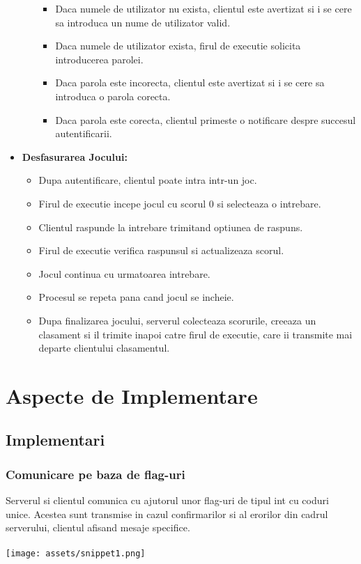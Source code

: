 \documentclass[runningheads]{llncs}
\begin{document}
\begin{itemize}[label=$\bullet$]
\begin{itemize}[label=$\bullet$]
                \begin{itemize}[label=$\bullet$]
                    \item Daca numele de utilizator nu exista, clientul este avertizat si i se cere sa introduca un nume de utilizator valid.
                    \item Daca numele de utilizator exista, firul de executie solicita introducerea parolei.
                    \item Daca parola este incorecta, clientul este avertizat si i se cere sa introduca o parola corecta.
                    \item Daca parola este corecta, clientul primeste o notificare despre succesul autentificarii.
                \end{itemize}
        \end{itemize}
    \item \textbf{Desfasurarea Jocului:}
        \begin{itemize}[label=$\bullet$]
            \item Dupa autentificare, clientul poate intra intr-un joc.
            \item Firul de executie incepe jocul cu scorul 0 si selecteaza o intrebare.
            \item Clientul raspunde la intrebare trimitand optiunea de raspuns.
            \item Firul de executie verifica raspunsul si actualizeaza scorul.
            \item Jocul continua cu urmatoarea intrebare.
            \item Procesul se repeta pana cand jocul se incheie.
            \item Dupa finalizarea jocului, serverul colecteaza scorurile, creeaza un clasament si il trimite inapoi catre firul de executie, care ii transmite mai departe clientului clasamentul.
        \end{itemize}
\end{itemize}

\section{Aspecte de Implementare}

\subsection{Implementari}

\subsubsection{Comunicare pe baza de flag-uri}
Serverul si clientul comunica cu ajutorul unor flag-uri de tipul int cu coduri unice. Acestea sunt transmise in cazul confirmarilor si al erorilor din cadrul serverului, clientul afisand mesaje specifice.\\\\
\texttt{[image: assets/snippet1.png]}
\end{document}

